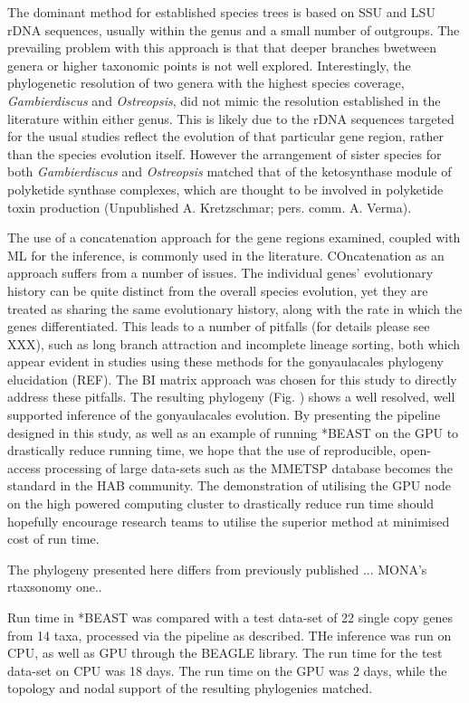 \documentclass[12pt]{article}
\begin{document}
The dominant method for established species trees is based on SSU and LSU rDNA sequences, usually within the genus and a small number of outgroups. The prevailing problem with this approach is that that deeper branches bwetween genera or higher taxonomic points is not well explored. Interestingly, the phylogenetic resolution of two genera with the highest species coverage, \emph{Gambierdiscus} and \emph{Ostreopsis}, did not mimic the resolution established in the literature within either genus. This is likely due to the rDNA sequences targeted for the usual studies reflect the evolution of that particular gene region, rather than the species evolution itself. However the arrangement of sister species for both \emph{Gambierdiscus} and \emph{Ostreopsis} matched that of the ketosynthase module of polyketide synthase complexes, which are thought to be involved in polyketide toxin production (Unpublished A. Kretzschmar; pers. comm. A. Verma). 

The use of a concatenation approach for the gene regions examined, coupled with ML for the inference, is commonly used in the literature. COncatenation as an approach suffers from a number of issues. The individual genes' evolutionary history can be quite distinct from the overall species evolution, yet they are treated as sharing the same evolutionary history, along with the rate in which the genes differentiated. This leads to a number of pitfalls (for details please see XXX), such as long branch attraction and incomplete lineage sorting, both which appear evident in studies using these methods for the gonyaulacales phylogeny elucidation (REF).
The BI matrix approach was chosen for this study to directly address these pitfalls. The resulting phylogeny (Fig. ) shows a well resolved, well supported inference of the gonyaulacales evolution. By presenting the pipeline designed in this study, as well as an example of running *BEAST on the GPU to drastically reduce running time, we hope that the use of reproducible, open-access processing of large data-sets such as the MMETSP database becomes the standard in the HAB community. The demonstration of utilising the GPU node on the high powered computing cluster to drastically reduce run time should hopefully encourage research teams to utilise the superior method at minimised cost of run time. 

The phylogeny presented here differs from previously published ... MONA's rtaxsonomy one..

Run time in *BEAST was compared with a test data-set of 22 single copy genes from 14 taxa, processed via the pipeline as described. THe inference was run on CPU, as well as GPU through the BEAGLE library.
The run time for the test data-set on CPU was 18 days. The run time on the GPU was 2 days, while the topology and nodal support of the resulting phylogenies matched.
\end{document}
